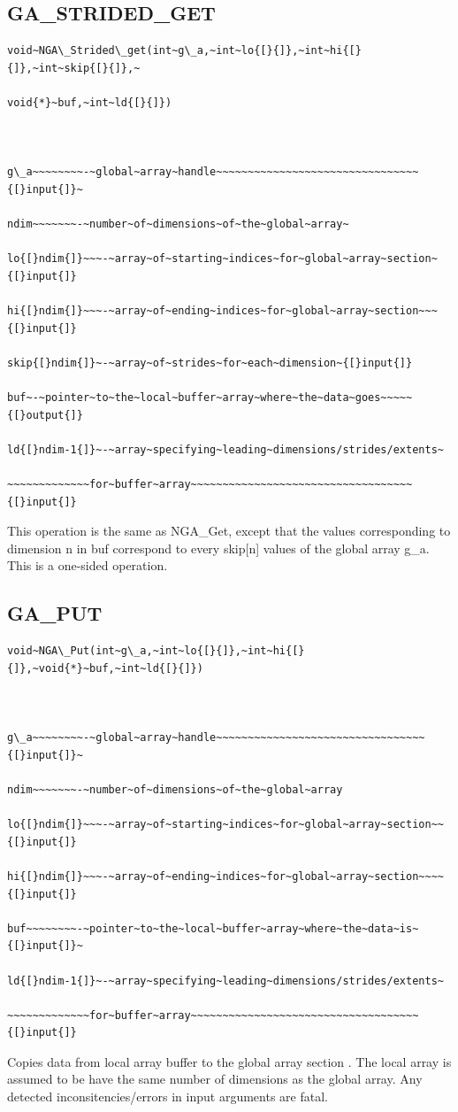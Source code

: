\subsection*{\label{sub:GA_STRIDED_GET}GA\_STRIDED\_GET}
\begin{verbatim}
void~NGA\_Strided\_get(int~g\_a,~int~lo{[}{]},~int~hi{[}{]},~int~skip{[}{]},~

void{*}~buf,~int~ld{[}{]})



g\_a~~~~~~~~-~global~array~handle~~~~~~~~~~~~~~~~~~~~~~~~~~~~~~~~{[}input{]}~

ndim~~~~~~~-~number~of~dimensions~of~the~global~array~

lo{[}ndim{]}~~~-~array~of~starting~indices~for~global~array~section~{[}input{]}

hi{[}ndim{]}~~~-~array~of~ending~indices~for~global~array~section~~~{[}input{]}

skip{[}ndim{]}~-~array~of~strides~for~each~dimension~{[}input{]}

buf~-~pointer~to~the~local~buffer~array~where~the~data~goes~~~~~{[}output{]}

ld{[}ndim-1{]}~-~array~specifying~leading~dimensions/strides/extents~

~~~~~~~~~~~~~for~buffer~array~~~~~~~~~~~~~~~~~~~~~~~~~~~~~~~~~~~{[}input{]}
\end{verbatim}
This operation is the same as NGA\_Get, except that the values corresponding
to dimension n in buf correspond to every skip{[}n{]} values of the
global array g\_a. This is a one-sided operation. 


\subsection*{\label{sub:GA_PUT}GA\_PUT}
\begin{verbatim}
void~NGA\_Put(int~g\_a,~int~lo{[}{]},~int~hi{[}{]},~void{*}~buf,~int~ld{[}{]})



g\_a~~~~~~~~-~global~array~handle~~~~~~~~~~~~~~~~~~~~~~~~~~~~~~~~~{[}input{]}~

ndim~~~~~~~-~number~of~dimensions~of~the~global~array

lo{[}ndim{]}~~~-~array~of~starting~indices~for~global~array~section~~{[}input{]}

hi{[}ndim{]}~~~-~array~of~ending~indices~for~global~array~section~~~~{[}input{]}

buf~~~~~~~~-~pointer~to~the~local~buffer~array~where~the~data~is~{[}input{]}~

ld{[}ndim-1{]}~-~array~specifying~leading~dimensions/strides/extents~

~~~~~~~~~~~~~for~buffer~array~~~~~~~~~~~~~~~~~~~~~~~~~~~~~~~~~~~~{[}input{]}
\end{verbatim}
Copies data from local array buffer to the global array section .
The local array is assumed to be have the same number of dimensions
as the global array. Any detected inconsitencies/errors in input arguments
are fatal.

